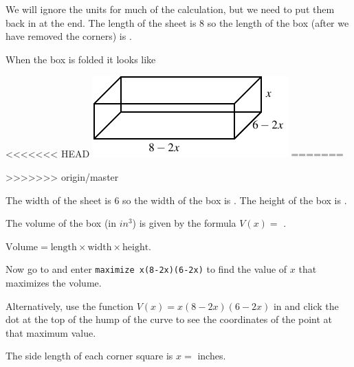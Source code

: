\documentclass{ximera}
\begin{document}
\begin{question}
We will ignore the units for much of the calculation, but we need to put them back in at the end. The length of the sheet is $8$ so the length of the box (after we have removed the corners) is .
\begin{hint}
When the box is folded it looks like
\begin{image}
<<<<<<< HEAD
\includegraphics{Optimization2.png}
=======
>>>>>>> origin/master
\end{image}
\end{hint}
The width of the sheet is $6$ so the width of the box is . The height of the box is . 

The volume of the box (in $\si{in^3}$) is given by the formula $V(x)=$ .
\begin{hint}
$\text{Volume}=\text{length}\times\text{width}\times\text{height}$.
\end{hint}

Now go to  and enter \texttt{maximize x(8-2x)(6-2x)} to find the value of $x$ that maximizes the volume. 

Alternatively, use the function $V(x)=x(8-2x)(6-2x)$ in  and click the dot at the top of the hump of the curve to see the coordinates of the point at that maximum value.

The side length of each corner square is  $x=$  inches.

\end{question}
\end{document}
